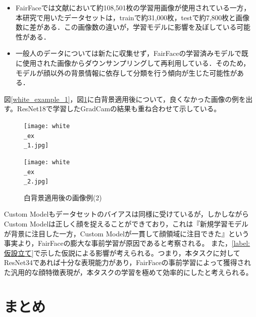 \documentclass[a4paper,11pt,titlepage]{jsarticle}
\begin{document}
\begin{itemize}
  \begin{itemize}
    \item FairFaceでは文献\cite{karkkainenFairFace}において約108,501枚の学習用画像が使用されている一方，本研究で用いたデータセットは，trainで約31,000枚，testで約7,800枚と画像数に差がある．この画像数の違いが，学習モデルに影響を及ぼしている可能性がある．
    \item 一般人のデータについては新たに収集せず，FairFaceの学習済みモデルで既に使用された画像からダウンサンプリングして再利用している．そのため，モデルが顔以外の背景情報に依存して分類を行う傾向が生じた可能性がある．
  \end{itemize}
\end{itemize}



図\ref{white_example_1}，図\ref{white_example_2}に白背景適用後について，良くなかった画像の例を出す。ResNet18で学習したGradCamの結果も重ね合わせて示している。
\begin{figure}[H]
  \centering
  \begin{minipage}[b]{0.48\linewidth}
    \centering
    \texttt{[image: white\\\_ex\\\_1.jpg]}
    \caption{白背景適用後の画像例(1)}  
    \label{white_example_1}
  \end{minipage}
  \hfill
  \begin{minipage}[b]{0.48\linewidth}
    \centering
    \texttt{[image: white\\\_ex\\\_2.jpg]}
     \caption{白背景適用後の画像例(2)}   
    \label{white_example_2}
  \end{minipage}
\end{figure}


Custom Modelもデータセットのバイアスは同様に受けているが，しかしながらCustom Modelは正しく顔を捉えることができており，これは『新規学習モデルが背景に注目した一方，Custom Modelが一貫して顔領域に注目できた』という事実より，FairFaceの膨大な事前学習が原因であると考察される。
また，\ref{label:仮設立て}で示した仮説による影響が考えられる。つまり，本タスクに対してResNet34であれば十分な表現能力があり，FairFaceの事前学習によって獲得された汎用的な顔特徴表現が，本タスクの学習を極めて効率的にしたと考えられる。



\section{まとめ}
\label{label:まとめ}
\end{document}
